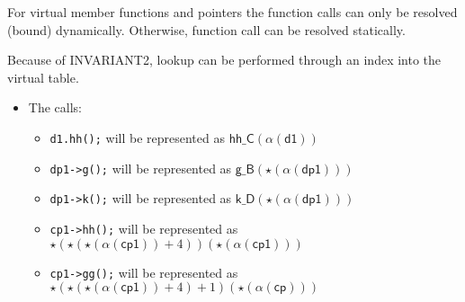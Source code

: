 

For virtual member functions and pointers the function calls 
can only be resolved (bound) dynamically. Otherwise, 
function call can be resolved statically. 
 
Because of INVARIANT2, lookup can be performed 
through an index into the virtual table. 


\begin{itemize}  
\item The calls: 
\renewcommand{\labelitemi}{$\Box$}
\begin{itemize} 
\item \lstinline{d1.hh();} will be represented as $\textsf{hh\_C}(\alpha(\textsf{d1}))$
\item \lstinline{dp1->g();} will be represented as $\textsf{g\_B}(\star(\alpha(\textsf{dp1})))$
\item \lstinline{dp1->k();} will be represented as $\textsf{k\_D}(\star(\alpha(\textsf{dp1})))$
\item \lstinline{cp1->hh();} will be represented as 
$\star(\star(\star(\alpha(\textsf{cp1}))+4))(\star(\alpha(\textsf{cp1})))$
\item  \lstinline{cp1->gg();} will be represented as 
$\star(\star(\star(\alpha(\textsf{cp1}))+4)+1)(\star(\alpha(\textsf{cp})))$
\end{itemize} 

\end{itemize} 

\frmrule

